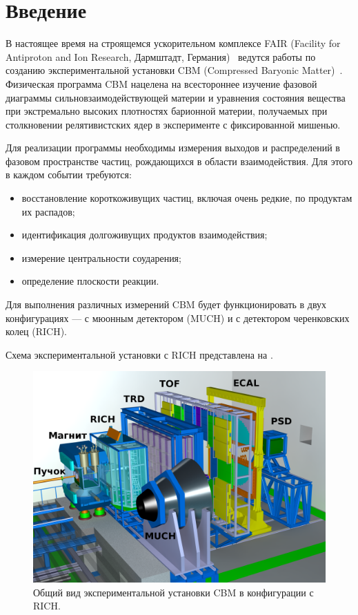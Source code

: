 \section*{Введение}\label{section:secIntro}

В настоящее время на строящемся ускорительном комплексе FAIR (Facility for Antiproton and Ion Research, Дармштадт, Германия)~\cite{FAIR} ведутся работы по созданию экспериментальной установки CBM (Compressed Baryonic Matter)~\cite{CBMBook, CBMSIS100, CBM_TSR, ProgressReport2014}. Физическая программа CBM нацелена на всестороннее изучение фазовой диаграммы сильновзаимодействующей материи и уравнения состояния вещества при экстремально высоких плотностях барионной материи, получаемых при столкновении релятивистских ядер в эксперименте с фиксированной мишенью.

Для реализации программы необходимы измерения выходов и распределений в фазовом пространстве частиц, рождающихся в области взаимодействия. Для этого в каждом событии требуются:
\begin{itemize}
\item {восстановление короткоживущих частиц, включая очень редкие, по продуктам их распадов;}
\item {идентификация долгоживущих продуктов взаимодействия;}
\item {измерение центральности соударения;}
\item {определение плоскости реакции.}
\end{itemize}

Для выполнения различных измерений CBM будет функционировать в двух конфигурациях --- с мюонным детектором (MUCH) и с детектором черенковских колец (RICH).

Схема экспериментальной установки с RICH представлена на .

\begin{figure}
\includegraphics[width=1.0\textwidth]{pictures/1_CBM_SIS100_with_names.png}
\caption{Общий вид экспериментальной установки CBM в конфигурации с RICH.}
\label{fig:CBM}
\end{figure}

